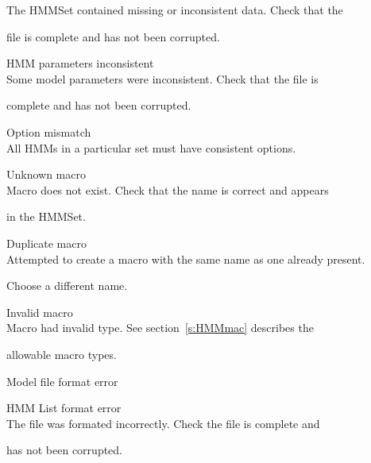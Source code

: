 \begin{itemize}
\begin{itemize}
        The HMMSet contained missing or inconsistent data.  Check that the 


        file is complete and has not been corrupted.





    HMM parameters inconsistent\\


        Some model parameters were inconsistent.  Check that the file is 


        complete and has not been corrupted.





 Option mismatch\\


        All HMMs in a particular set must have consistent options.





    Unknown macro\\


        Macro does not exist.  Check that the name is correct and appears 


        in the HMMSet.





    Duplicate macro\\


        Attempted to create a macro with the same name as one already present.


        Choose a different name.





    Invalid macro\\


        Macro had invalid type.  See section~\ref{s:HMMmac} describes the 


        allowable macro types.





    Model file format error


    HMM List format error\\


        The file was formated incorrectly.  Check the file is complete and


        has not been corrupted.






\end{itemize}
\end{itemize}
